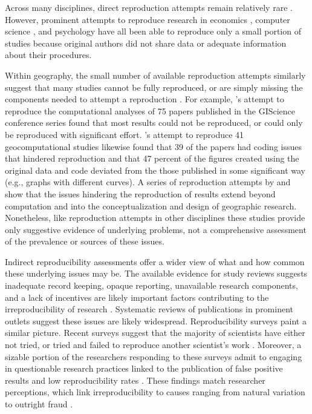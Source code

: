 \documentclass[]{interact}
\theoremstyle{plain}%
\theoremstyle{definition}
\theoremstyle{remark}
\begin{document}
Across many disciplines, direct reproduction attempts remain relatively rare \citep[see][]{chang2015economics, moraila2014measuring, iqbal2016reproducible,sumner2020reproducibility}.
However, prominent attempts to reproduce research in economics \citep{chang2015economics}, computer science \citep{moraila2014measuring}, and psychology \citep{open2015estimating} have all been able to reproduce only a small portion of studies because original authors did not share data or adequate information about their procedures.

Within geography, the small number of available reproduction attempts similarly suggest that many studies cannot be fully reproduced, or are simply missing the components needed to attempt a reproduction \citep{nust2018, Kedron2021ssrn, konkol2019, ostermann2021, Nust_AGILE_2022}.
For example, \citet{ostermann2021}'s attempt to reproduce the computational analyses of 75 papers published in the GIScience conference series found that most results could not be reproduced, or could only be reproduced with significant effort. 
\citet{konkol2019}'s attempt to reproduce 41 geocomputational studies likewise found that 39 of the papers had coding issues that hindered reproduction and that 47 percent of the figures created using the original data and code deviated from the those published in some significant way (e.g., graphs with different curves). 
A series of reproduction attempts by \citet{Kedron_MollaloRP, Kedron_SaffaryRP, Kedron_VijayanRP} and \citet{paez2022reproducibility} show that the issues hindering the reproduction of results extend beyond computation and into the conceptualization and design of geographic research.
Nonetheless, like reproduction attempts in other disciplines these studies provide only suggestive evidence of underlying problems, not a comprehensive assessment of the prevalence or sources of these issues.

Indirect reproducibility assessments offer a wider view of what and how common these underlying issues may be. 
The available evidence for study reviews suggests inadequate record keeping, opaque reporting, unavailable research components, and a lack of incentives are likely important factors contributing to the irreproducibility of research \citep{NASEM2019}. 
Systematic reviews of publications in prominent outlets \citep{byrne_2017,stodden2018empirical} suggest these issues are likely widespread. 
Reproducibility surveys paint a similar picture. 
Recent surveys suggest that the majority of scientists have either not tried, or tried and failed to reproduce another scientist's work \citep{baker20161, boulbes2018survey}. 
Moreover, a sizable portion of the researchers responding to these surveys admit to engaging in questionable research practices linked to the publication of false positive results and low reproducibility rates \citep{fanelli2009many, fraser2018questionable}.
These findings match researcher perceptions, which link irreproducibility to causes ranging from natural variation to outright fraud \citep{ranstam2000fraud, anderson2007normative, baker20161}. 
\end{document}
